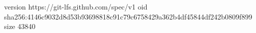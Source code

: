 version https://git-lfs.github.com/spec/v1
oid sha256:4146c9032d8d53b93698818c91c79c6758429a362b4df45844df242b0809f899
size 43840
